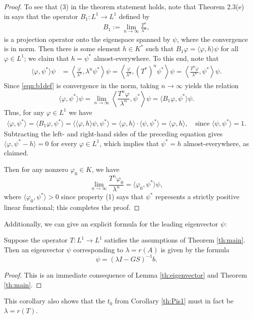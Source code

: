 \begin{proof}
	To see that (3) in the theorem statement holds, note that Theorem 2.3(e) in \cite{Marek1970} says that the operator $B_1:L^1 \to L^1$ defined by
	\begin{align}
		B_1 := \lim_{n \to \infty} \frac{T^n}{\lambda^n}, \label{eqn:b1def}
	\end{align}
	is a projection operator onto the eigenspace spanned by $\psi$, where the convergence is in norm. Then there is some element $h \in K^*$ such that $B_1 \varphi = \langle \varphi, h \rangle \psi$ for all $\varphi \in L^1$; we claim that $h = \psi^*$ almost-everywhere. To this end, note that
	\begin{align*}
		\langle \varphi, \psi^* \rangle \psi &= \left \langle \frac{\varphi}{\lambda^n}, \lambda^n \psi^* \right \rangle \psi = \left \langle \frac{\varphi}{\lambda^n}, (T^*)^n \psi^* \right \rangle \psi = \left \langle \frac{T^n \varphi}{\lambda^n}, \psi^* \right \rangle \psi.
	\end{align*}
	Since \eqref{eqn:b1def} is convergence in the norm, taking $n \to \infty$ yields the relation
	\[\langle \varphi, \psi^* \rangle \psi = \lim_{n \to \infty} \left \langle \frac{T^n \varphi}{\lambda^n}, \psi^* \right \rangle \psi = \langle B_1 \varphi, \psi^* \rangle \psi.\]
	Thus, for any $\varphi \in L^1$ we have
	\begin{align*}
		\langle \varphi, \psi^* \rangle = \langle B_1 \varphi, \psi^* \rangle = \langle \langle \varphi, h \rangle \psi, \psi^* \rangle = \langle \varphi, h \rangle \cdot \langle \psi, \psi^* \rangle = \langle \varphi, h \rangle, \quad \text{since } \langle \psi, \psi^* \rangle = 1.
	\end{align*}
	Subtracting the left- and right-hand sides of the preceding equation gives $\langle \varphi, \psi^* - h \rangle = 0$ for every $\varphi \in L^1$, which implies that $\psi^* = h$ almost-everywhere, as claimed.
	
	Then for any nonzero $\varphi_0 \in K$, we have
	\[\lim_{n \to \infty} \frac{T^n \varphi_0}{\lambda^n} = \langle \varphi_0, \psi^* \rangle \psi,\]
	where $\langle \varphi_0, \psi^* \rangle > 0$ since property (1) says that $\psi^*$ represents a strictly positive linear functional; this completes the proof. 
	
\end{proof}

Additionally, we can give an explicit formula for the leading eigenvector $\psi$:

\begin{corollary} \label{th:existenceofevector}
	Suppose the operator $T:L^1 \to L^1$ satisfies the assumptions of Theorem \ref{th:main}. Then an eigenvector $\psi$ corresponding to $\lambda = r(A)$ is given by the formula
	\[\psi = (\lambda I - GS)^{-1}b.\]
\end{corollary}

\begin{proof}
	This is an immediate consequence of Lemma \ref{th:eigenvector} and Theorem \ref{th:main}.
\end{proof}

This corollary also shows that the $t_0$ from Corollary \ref{th:Pis1} must in fact be $\lambda = r(T)$.